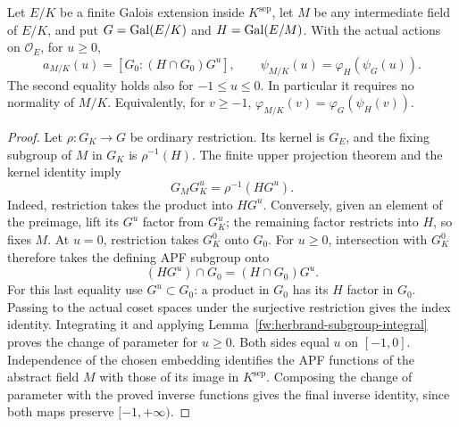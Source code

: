 \begin{proposition}
\label{fw:finite-nonnormal-apf}
\leanok
Let $E/K$ be a finite Galois extension inside $K^{\mathrm{sep}}$, let
$M$ be any intermediate field of $E/K$, and put $G=\operatorname{Gal}(E/K)$ and
$H=\operatorname{Gal}(E/M)$. With the actual actions on $\mathcal O_E$, for $u\geq0$,
\[
 a_{M/K}(u)=[G_0:(H\cap G_0)G^u],\qquad
 \psi_{M/K}(u)=\varphi_H(\psi_G(u)).
\]
The second equality holds also for $-1\leq u\leq0$. In particular it
requires no normality of $M/K$. Equivalently, for $v\geq-1$,
$\varphi_{M/K}(v)=\varphi_G(\psi_H(v))$.
\end{proposition}
\begin{proof}
Let $\rho:G_K\to G$ be ordinary restriction. Its kernel is $G_E$,
and the fixing subgroup of $M$ in $G_K$ is $\rho^{-1}(H)$.
The finite upper projection theorem and the kernel identity imply
\[
 G_MG_K^u=\rho^{-1}(HG^u).
\]
Indeed, restriction takes the product into $HG^u$. Conversely, given
an element of the preimage, lift its $G^u$ factor from $G_K^u$;
the remaining factor restricts into $H$, so fixes $M$. At $u=0$,
restriction takes $G_K^0$ onto $G_0$. For $u\geq0$, intersection with
$G_K^0$ therefore takes the defining APF subgroup onto
\[
 (HG^u)\cap G_0=(H\cap G_0)G^u.
\]
For this last equality use $G^u\subset G_0$: a product in $G_0$
has its $H$ factor in $G_0$. Passing to the actual coset spaces under
the surjective restriction gives the index identity. Integrating it
and applying Lemma~\ref{fw:herbrand-subgroup-integral} proves the
change of parameter for $u\geq0$. Both sides equal $u$ on $[-1,0]$.
Independence of the chosen embedding identifies the APF functions of
the abstract field $M$ with those of its image in $K^{\mathrm{sep}}$.
Composing the change of parameter with the proved inverse functions
gives the final inverse identity, since both maps preserve $[-1,+\infty)$.
\end{proof}

